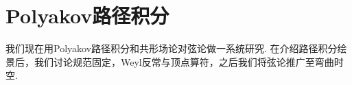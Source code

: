 \setcounter{section}{0}%
\setcounter{chapter}{2}

\chapter{Polyakov路径积分}
我们现在用Polyakov路径积分和共形场论对弦论做一系统研究. 在介绍路径积分绘景后，我们讨论规范固定，Weyl反常与顶点算符，之后我们将弦论推广至弯曲时空.
